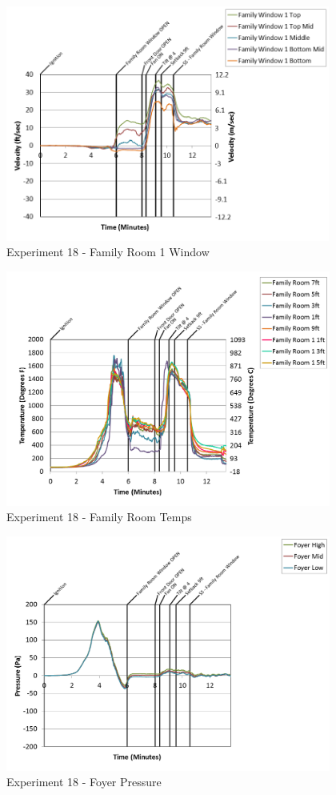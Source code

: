 \documentclass{article}
\begin{document}
\begin{appendices}
\begin{figure}[h!]
	\centering
	\includegraphics[height=3.05in]{0_Images/Results_Charts/Exp_18_Charts/FamilyRoom1Window.png}
	\caption{Experiment 18 - Family Room 1 Window}
\end{figure}

\clearpage

\begin{figure}[h!]
	\centering
	\includegraphics[height=3.05in]{0_Images/Results_Charts/Exp_18_Charts/FamilyRoomTemps.png}
	\caption{Experiment 18 - Family Room Temps}
\end{figure}


\begin{figure}[h!]
	\centering
	\includegraphics[height=3.05in]{0_Images/Results_Charts/Exp_18_Charts/FoyerPressure.png}
	\caption{Experiment 18 - Foyer Pressure}
\end{figure}


\end{appendices}
\end{document}
